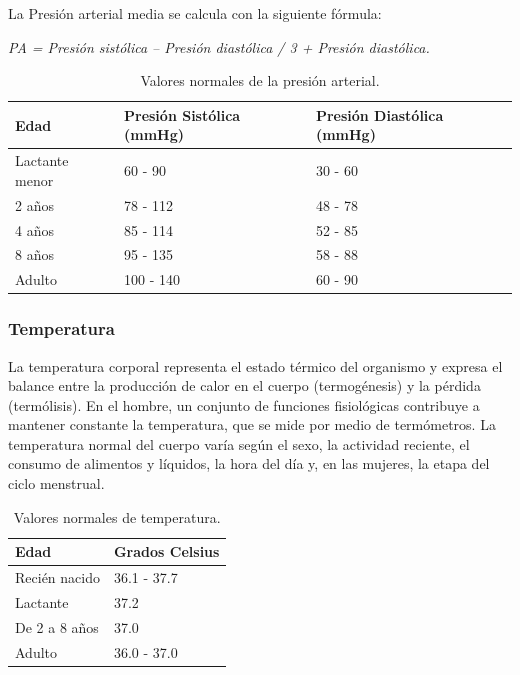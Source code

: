 	La Presión arterial media se calcula con la siguiente fórmula: 
	
	\begin{center}
		\textit{PA = Presión sistólica – Presión diastólica / 3 + Presión diastólica.}
	\end{center}
	
	\begin{table}[htbp]
		\begin{center}
			\begin{tabular}{|l|l|l|}
				\hline
				\textbf{Edad} & \textbf{Presión Sistólica (mmHg)} & \textbf{Presión Diastólica (mmHg)} \\
				\hline \hline
				Lactante menor & 60 - 90 & 30 - 60 \\
				\hline
				2 años  & 78 - 112 & 48 - 78 \\
				\hline
				4 años & 85 - 114 & 52 - 85 \\
				\hline
				8 años & 95 - 135 & 58 - 88 \\
				\hline
				Adulto & 100 - 140 & 60 - 90 \\
				\hline
			\end{tabular}
			\caption{Valores normales de la presión arterial.}
		\end{center}
	\end{table}
	
	\subsubsection{Temperatura}
	La temperatura corporal representa el estado térmico del organismo y expresa el balance entre la producción de calor en el cuerpo (termogénesis) y la pérdida (termólisis). En el hombre, un conjunto de funciones fisiológicas contribuye a mantener constante la temperatura, que se mide por medio de termómetros. La temperatura normal del cuerpo varía según el sexo, la actividad reciente, el consumo de alimentos y líquidos, la hora del día y, en las mujeres, la etapa del ciclo menstrual. 
	
	\begin{table}[htbp]
		\begin{center}
			\begin{tabular}{|l|l|}
				\hline
				\textbf{Edad} & \textbf{Grados Celsius} \\
				\hline \hline
				Recién nacido & 36.1 - 37.7  \\
				\hline
				Lactante & 37.2  \\
				\hline
				De 2 a 8 años & 37.0  \\
				\hline
				Adulto & 36.0 - 37.0  \\
				\hline
			\end{tabular}
			\caption{Valores normales de temperatura.}
		\end{center}
	\end{table}
	
